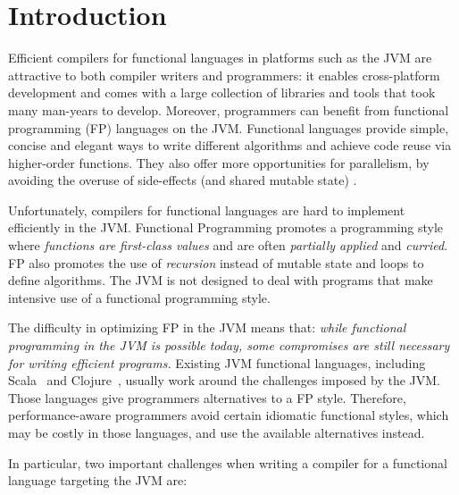 \section{Introduction}\label{sec:intro}


Efficient compilers for functional languages in platforms such as the JVM
are attractive to both compiler writers and programmers: 
it enables cross-platform development and comes with a
large collection of libraries and tools that took many
man-years to develop. Moreover, programmers can
benefit from functional programming (FP) languages on the
JVM. Functional languages provide
simple, concise and elegant ways to write different algorithms and achieve
code reuse via higher-order functions. They also
offer more opportunities for parallelism, by avoiding the overuse
of side-effects (and shared mutable state) \cite{erlang}.




Unfortunately, compilers for functional languages are hard to
implement efficiently in the JVM. Functional Programming promotes a
programming style where \emph{functions are first-class values} and are often
\emph{partially applied} and \emph{curried}. FP also promotes the use of \emph{recursion}
instead of mutable state and loops to define algorithms. The JVM is
not designed to deal with programs that make intensive use of a
functional programming style.

The difficulty in optimizing FP in the JVM means that: 
\emph{while functional programming in the JVM is possible today, 
some compromises are still necessary for writing efficient programs.}
Existing JVM functional languages, including
Scala~\cite{Odersky2014b} 
and Clojure~\cite{Hickey2008}, usually
work around the challenges imposed by the JVM. Those languages give
programmers alternatives to a FP
style. Therefore, performance-aware programmers avoid certain idiomatic
functional styles, which may be costly in those languages, and use
the available alternatives instead.
 
In particular, two important challenges when writing a
compiler for a functional language targeting the JVM are:

